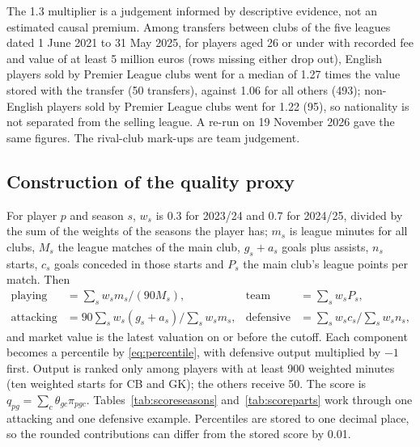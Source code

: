 The 1.3 multiplier is a judgement informed by descriptive evidence, not an estimated causal premium. Among transfers between clubs of the five leagues dated 1 June 2021 to 31 May 2025, for players aged 26 or under with recorded fee and value of at least 5 million euros (rows missing either drop out), English players sold by Premier League clubs went for a median of 1.27 times the value stored with the transfer (50 transfers), against 1.06 for all others (493); non-English players sold by Premier League clubs went for 1.22 (95), so nationality is not separated from the selling league. A re-run on 19 November 2026 gave the same figures. The rival-club mark-ups are team judgement.

\subsection{Construction of the quality proxy}\label{app:score}

For player $p$ and season $s$, $w_s$ is 0.3 for 2023/24 and 0.7 for 2024/25, divided by the sum of the weights of the seasons the player has; $m_s$ is league minutes for all clubs, $M_s$ the league matches of the main club, $g_s + a_s$ goals plus assists, $n_s$ starts, $c_s$ goals conceded in those starts and $P_s$ the main club's league points per match. Then
\begin{align*}
\text{playing time} &= \textstyle\sum_s w_s m_s / (90 M_s), & \text{team level} &= \textstyle\sum_s w_s P_s, \\
\text{attacking output} &= 90 \textstyle\sum_s w_s (g_s + a_s) \big/ \textstyle\sum_s w_s m_s, & \text{defensive output} &= \textstyle\sum_s w_s c_s \big/ \textstyle\sum_s w_s n_s,
\end{align*}
and market value is the latest valuation on or before the cutoff. Each component becomes a percentile by \eqref{eq:percentile}, with defensive output multiplied by $-1$ first. Output is ranked only among players with at least 900 weighted minutes (ten weighted starts for CB and GK); the others receive 50. The score is $q_{pg} = \sum_c \theta_{gc} \pi_{pgc}$. Tables~\ref{tab:scoreseasons} and~\ref{tab:scoreparts} work through one attacking and one defensive example. Percentiles are stored to one decimal place, so the rounded contributions can differ from the stored score by 0.01.

\begin{apptable}
\label{tab:scoreseasons}
\end{apptable}

